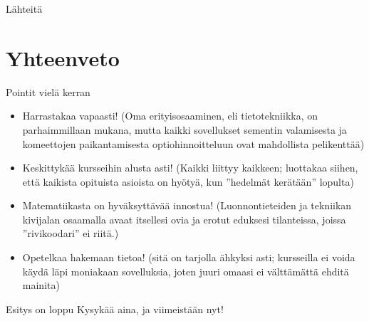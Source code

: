 \documentclass[pdf,handout,10pt]{beamer}
\begin{document}
\beamerdefaultoverlayspecification{}
\begin{frame}[allowframebreaks]{Lähteitä}

  \tiny
  
  

\end{frame}

\beamerdefaultoverlayspecification{<+->}

\section{Yhteenveto}
\begin{frame}{Pointit vielä kerran}
\begin{itemize}
\item Harrastakaa vapaasti! (Oma erityisosaaminen, eli tietotekniikka,
  on parhaimmillaan mukana, mutta kaikki sovellukset sementin
  valamisesta ja komeettojen paikantamisesta optiohinnoitteluun ovat
  mahdollista pelikenttää)
\item Keskittykää kursseihin alusta asti! (Kaikki liittyy kaikkeen;
  luottakaa siihen, että kaikista opituista asioista on hyötyä, kun
  ''hedelmät kerätään'' lopulta)
\item Matematiikasta on hyväksyttävää innostua! (Luonnontieteiden ja
  tekniikan kivijalan osaamalla avaat itsellesi ovia ja erotut
  eduksesi tilanteissa, joissa ''rivikoodari'' ei riitä.)
\item Opetelkaa hakemaan tietoa! (sitä on tarjolla ähkyksi asti;
  kursseilla ei voida käydä läpi moniakaan sovelluksia, joten juuri
  omaasi ei välttämättä ehditä mainita)
  
\end{itemize}
\end{frame}

\begin{frame}{Esitys on loppu}
  Kysykää aina, ja viimeistään nyt!
\end{frame}
\end{document}
